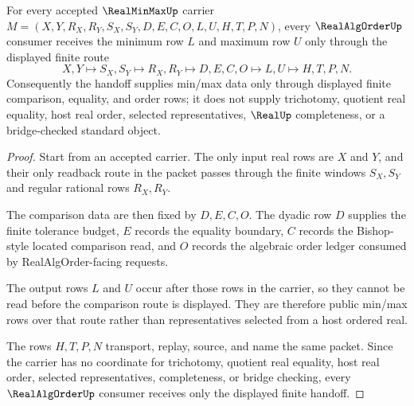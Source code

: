 \begin{theorem}
\label{thm:real-min-max-finite-comparison-handoff}
For every accepted $\RealMinMaxUp$ carrier $M=(X,Y,R_X,R_Y,S_X,S_Y,D,E,C,O,L,U,H,T,P,N)$, every $\RealAlgOrderUp$ consumer receives the minimum row $L$ and maximum row $U$ only through the displayed finite route
$$
X,Y \longmapsto S_X,S_Y \longmapsto R_X,R_Y \longmapsto D,E,C,O \longmapsto L,U \longmapsto H,T,P,N .
$$
Consequently the handoff supplies min/max data only through displayed finite comparison, equality, and order rows; it does not supply trichotomy, quotient real equality, host real order, selected representatives, $\RealUp$ completeness, or a bridge-checked standard object.
\end{theorem}
\begin{proof}
Start from an accepted carrier. The only input real rows are $X$ and $Y$, and their only readback route in the packet passes through the finite windows $S_X,S_Y$ and regular rational rows $R_X,R_Y$.

The comparison data are then fixed by $D,E,C,O$. The dyadic row $D$ supplies the finite tolerance budget, $E$ records the equality boundary, $C$ records the Bishop-style located comparison read, and $O$ records the algebraic order ledger consumed by RealAlgOrder-facing requests.

The output rows $L$ and $U$ occur after those rows in the carrier, so they cannot be read before the comparison route is displayed. They are therefore public min/max rows over that route rather than representatives selected from a host ordered real.

The rows $H,T,P,N$ transport, replay, source, and name the same packet. Since the carrier has no coordinate for trichotomy, quotient real equality, host real order, selected representatives, completeness, or bridge checking, every $\RealAlgOrderUp$ consumer receives only the displayed finite handoff.
\end{proof}

